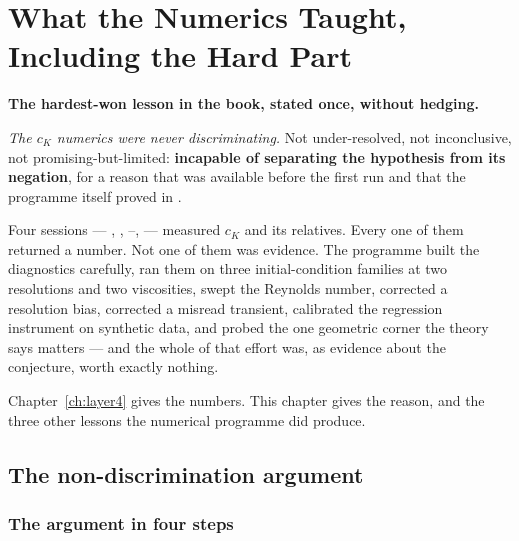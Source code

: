 \chapter{What the Numerics Taught, Including the Hard Part}
\label{ch:numerical-lessons}

\begin{record}
\textbf{The hardest-won lesson in the book, stated once, without hedging.}

\smallskip
\emph{The \(c_K\) numerics were never discriminating.} Not
under-resolved, not inconclusive, not promising-but-limited: \textbf{incapable
of separating the hypothesis from its negation}, for a reason that was
available before the first run and that the programme itself proved in
.

\smallskip
Four sessions --- , , --,  --- measured
\(c_K\) and its relatives. Every one of them returned a number. Not one of
them was evidence. The programme built the diagnostics carefully, ran them on
three initial-condition families at two resolutions and two viscosities,
swept the Reynolds number, corrected a resolution bias, corrected a misread
transient, calibrated the regression instrument on synthetic data, and probed
the one geometric corner the theory says matters --- and the whole of that
effort was, as evidence about the conjecture, worth exactly nothing.

\smallskip
Chapter~\ref{ch:layer4} gives the numbers. This chapter gives the reason, and
the three other lessons the numerical programme did produce.
\end{record}

\section{The non-discrimination argument}
\label{sec:nondiscrimination}

\subsection{The argument in four steps}

